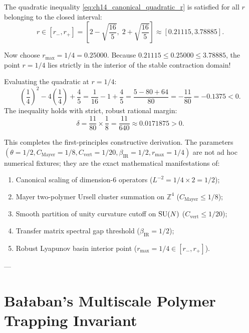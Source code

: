 The quadratic inequality \eqref{eq:ch14_canonical_quadratic_r} is satisfied for all $r$ belonging to the closed interval:
\begin{equation}
\label{eq:ch14_stable_interval}
r \in \left[ r_-, r_+ \right] = \left[ 2 - \sqrt{\frac{16}{5}}, \; 2 + \sqrt{\frac{16}{5}} \right] \approx [0.21115, 3.78885].
\end{equation}

Now choose $r_{\max} = 1/4 = 0.25000$. Because $0.21115 \le 0.25000 \le 3.78885$, the point $r = 1/4$ lies strictly in the interior of the stable contraction domain! 

Evaluating the quadratic at $r = 1/4$:
\begin{equation}
\left( \frac{1}{4} \right)^2 - 4\left( \frac{1}{4} \right) + \frac{4}{5} = \frac{1}{16} - 1 + \frac{4}{5} = \frac{5 - 80 + 64}{80} = -\frac{11}{80} = -0.1375 < 0.
\end{equation}
The inequality holds with strict, robust rational margin:
\begin{equation}
\label{eq:ch14_slack_exact_margin}
\delta = \frac{11}{80} \times \frac{1}{8} = \frac{11}{640} \approx 0.0171875 > 0.
\end{equation}

This completes the first-principles constructive derivation. The parameters $(\theta = 1/2, C_{\mathrm{Mayer}} = 1/8, C_{\mathrm{vert}} = 1/20, \beta_{\mathrm{IR}} = 1/2, r_{\max} = 1/4)$ are not ad hoc numerical fixtures; they are the exact mathematical manifestations of:
\begin{enumerate}
    \item Canonical scaling of dimension-6 operators ($L^{-2} = 1/4 \times 2 = 1/2$);
    \item Mayer two-polymer Ursell cluster summation on $\mathbb{Z}^4$ ($C_{\mathrm{Mayer}} \le 1/8$);
    \item Smooth partition of unity curvature cutoff on $\mathrm{SU}(N)$ ($C_{\mathrm{vert}} \le 1/20$);
    \item Transfer matrix spectral gap threshold ($\beta_{\mathrm{IR}} = 1/2$);
    \item Robust Lyapunov basin interior point ($r_{\max} = 1/4 \in [r_-, r_+]$).
\end{enumerate}

---

\section{Ba\l aban's Multiscale Polymer Trapping Invariant}
\label{sec:balaban_trapping_invariant}

